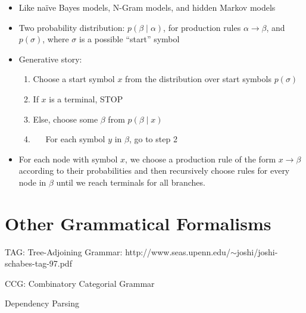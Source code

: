 \documentclass[11pt,letterpaper]{article}
\newcommand{\ra}{\rightarrow}
\begin{document}
\begin{itemize}
  \item Like na\"{i}ve Bayes models, N-Gram models, and hidden Markov models
  \item Two probability distribution: $p(\beta \mid \alpha)$, for production rules $\alpha \ra \beta$, and $p(\sigma)$, where $\sigma$ is a possible ``start'' symbol
  \item Generative story:
    \begin{enumerate}
      \item Choose a start symbol $x$ from the distribution over start symbols $p(\sigma)$
      \item If $x$ is a terminal, STOP
      \item Else, choose some $\beta$ from $p(\beta \mid x)$
      \item ~~~For each symbol $y$ in $\beta$, go to step 2
    \end{enumerate}
  \item For each node with symbol $x$, we choose a production rule of the form $x \ra \beta$ according to their probabilities and then recursively choose rules for every node in $\beta$ until we reach terminals for all branches.
\end{itemize}












\section{Other Grammatical Formalisms}

TAG: Tree-Adjoining Grammar: http://www.seas.upenn.edu/$\sim$joshi/joshi-schabes-tag-97.pdf

CCG: Combinatory Categorial Grammar

Dependency Parsing
\end{document}
